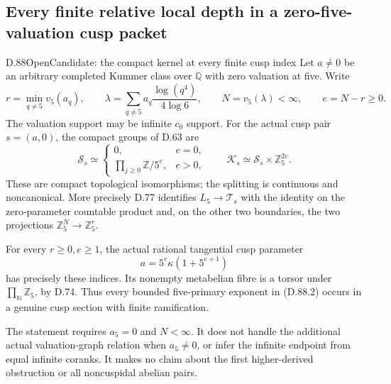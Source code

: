 \subsection{Every finite relative local depth in a zero-five-valuation cusp packet}

\begin{statement}{D.88}{Open}{Candidate: the compact kernel at every finite cusp index}
Let \(a\ne0\) be an arbitrary completed Kummer class over
\(\mathbb Q\) with zero valuation at five. Write
\[
 r=\min_{q\ne5}v_5(a_q),\qquad
 \lambda=\sum_{q\ne5}a_q\frac{\log(q^4)}{4\log6},
 \qquad N=v_5(\lambda)<\infty,
 \qquad e=N-r\ge0.                                    \tag{D.88.1}
\]
The valuation support may be infinite \(c_0\) support. For the
actual cusp pair \(s=(a,0)\), the compact groups of D.63 are
\[
 \mathcal S_s\simeq
 \begin{cases}
  0,&e=0,\\
  \displaystyle\prod_{j\ge0}\mathbb Z/5^e,&e>0,
 \end{cases}
 \qquad
 \mathcal K_s\simeq\mathcal S_s\times\mathbb Z_5^{2e}.
                                                               \tag{D.88.2}
\]
These are compact topological isomorphisms; the splitting is
continuous and noncanonical. More precisely D.77 identifies
\(L_5\to\mathcal T_s\) with the identity on the zero-parameter
countable product and, on the other two boundaries, the two
projections \(\mathbb Z_5^N\to\mathbb Z_5^r\).

For every \(r\ge0,e\ge1\), the actual rational tangential
cusp parameter
\[
                    a=5^r\kappa(1+5^{e+1})             \tag{D.88.3}
\]
has precisely these indices. Its nonempty metabelian fibre is
a torsor under \(\prod_{\mathbb N}\mathbb Z_5\), by D.74.
Thus every bounded five-primary exponent in (D.88.2) occurs
in a genuine cusp section with finite ramification.

The statement requires \(a_5=0\) and \(N<\infty\).
It does not handle the additional actual valuation-graph
relation when \(a_5\ne0\), or infer the infinite endpoint
from equal infinite coranks. It makes no claim about the first
higher-derived obstruction or all noncuspidal abelian pairs.
\end{statement}


